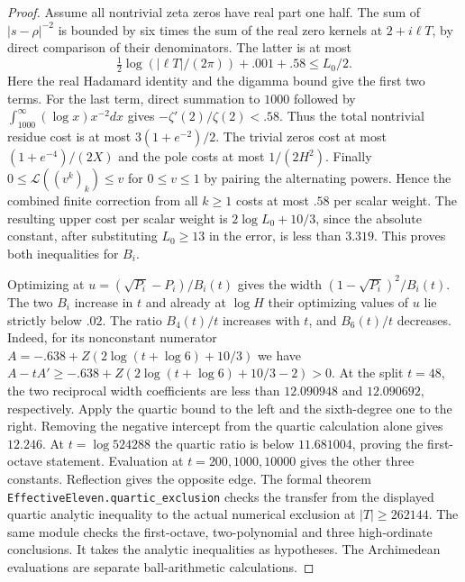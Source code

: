 \documentclass[11pt]{article}
\begin{document}
\begin{proof}
Assume all nontrivial zeta zeros have real part one half. The sum of $|s-\rho|^{-2}$ is bounded by six times the sum of the real zero kernels at $2+i\ell T$, by direct comparison of their denominators. The latter is at most
\[
 \tfrac12\log(|\ell T|/(2\pi))+.001+.58 \le L_0/2.
\]
Here the real Hadamard identity and the digamma bound give the first two terms. For the last term, direct summation to $1000$ followed by $\int_{1000}^\infty (\log x)x^{-2}dx$ gives $-\zeta'(2)/\zeta(2)<.58$. Thus the total nontrivial residue cost is at most $3(1+e^{-2})/2$. The trivial zeros cost at most $(1+e^{-4})/(2X)$ and the pole costs at most $1/(2H^2)$. Finally $0\le\mathcal L((v^k)_k)\le v$ for $0\le v\le1$ by pairing the alternating powers. Hence the combined finite correction from all $k\ge1$ costs at most $.58$ per scalar weight. The resulting upper cost per scalar weight is $2\log L_0+10/3$, since the absolute constant, after substituting $L_0\ge13$ in the error, is less than $3.319$. This proves both inequalities for $B_i$.

Optimizing at $u=(\sqrt{P_i}-P_i)/B_i(t)$ gives the width $(1-\sqrt{P_i})^2/B_i(t)$. The two $B_i$ increase in $t$ and already at $\log H$ their optimizing values of $u$ lie strictly below $.02$. The ratio $B_4(t)/t$ increases with $t$, and $B_6(t)/t$ decreases. Indeed, for its nonconstant numerator $A=-.638+Z(2\log(t+\log6)+10/3)$ we have $A-t A'\ge-.638+Z(2\log(t+\log6)+10/3-2)>0$. At the split $t=48$, the two reciprocal width coefficients are less than $12.090948$ and $12.090692$, respectively. Apply the quartic bound to the left and the sixth-degree one to the right. Removing the negative intercept from the quartic calculation alone gives $12.246$. At $t=\log524288$ the quartic ratio is below $11.681004$, proving the first-octave statement. Evaluation at $t=200,1000,10000$ gives the other three constants. Reflection gives the opposite edge. The formal theorem \texttt{EffectiveEleven.quartic\_exclusion} checks the transfer from the displayed quartic analytic inequality to the actual numerical exclusion at $|T|\ge262144$. The same module checks the first-octave, two-polynomial and three high-ordinate conclusions. It takes the analytic inequalities as hypotheses. The Archimedean evaluations are separate ball-arithmetic calculations.
\end{proof}
\end{document}
